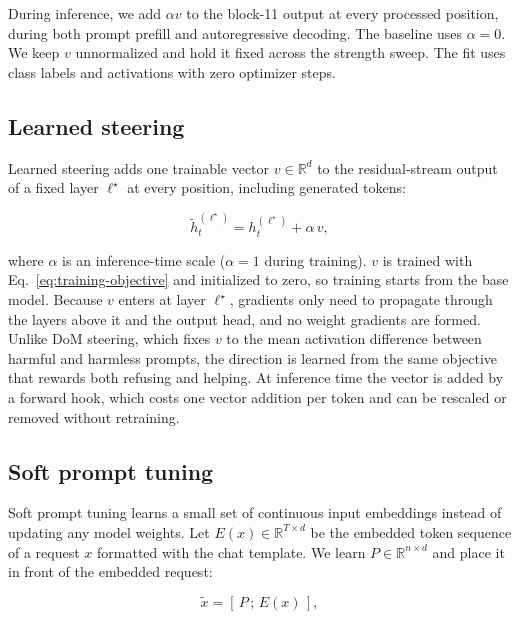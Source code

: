 \documentclass{article}
\begin{document}
During inference, we add $\alpha v$ to the block-11 output at every processed position, during both prompt prefill and autoregressive decoding. The baseline uses $\alpha = 0$. We keep $v$ unnormalized and hold it fixed across the strength sweep. The fit uses class labels and activations with zero optimizer steps.

\subsection{Learned steering}\label{sec:3.4}

Learned steering adds one trainable vector $v \in \mathbb{R}^d$ to the residual-stream output of a fixed layer $\ell^\star$ at every position, including generated tokens:

\begin{equation}
\label{eq:learned-steering}
\tilde{h}^{(\ell^\star)}_t = h^{(\ell^\star)}_t + \alpha\, v,
\end{equation}

where $\alpha$ is an inference-time scale ($\alpha = 1$ during training). $v$ is trained with Eq.~\eqref{eq:training-objective} and initialized to zero, so training starts from the base model. Because $v$ enters at layer $\ell^\star$, gradients only need to propagate through the layers above it and the output head, and no weight gradients are formed. Unlike DoM steering, which fixes $v$ to the mean activation difference between harmful and harmless prompts, the direction is learned from the same objective that rewards both refusing and helping. At inference time the vector is added by a forward hook, which costs one vector addition per token and can be rescaled or removed without retraining.

\subsection{Soft prompt tuning}\label{sec:3.5}

Soft prompt tuning learns a small set of continuous input embeddings instead of updating any model weights. Let $E(x) \in \mathbb{R}^{T\times d}$ be the embedded token sequence of a request $x$ formatted with the chat template. We learn $P \in \mathbb{R}^{n\times d}$ and place it in front of the embedded request:

\begin{equation}
\label{eq:soft-prompt}
\tilde x = [\,P\,;\,E(x)\,],
\end{equation}
\end{document}
